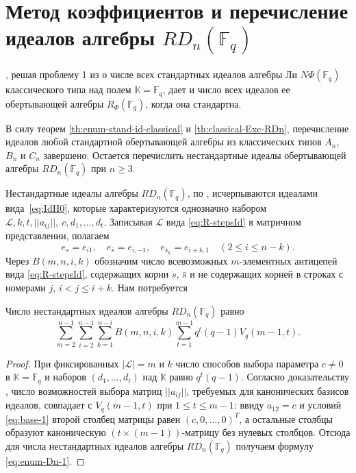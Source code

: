 \documentclass[a4paper,14pt,oneside,openany]{memoir}
\begin{document}
\section{Метод коэффициентов и перечисление идеалов алгебры \texorpdfstring{$RD_n(\mathbb{F}_q)$}{RDₙ(F₍q₎)}}\label{sec:egorychev-RDn}
%
, решая проблему 1 из \cite{sigsam2001}
о числе всех стандартных идеалов алгебры Ли $N\Phi(\mathbb{F}_q)$ классического
типа над полем $\mathbb{K}=\mathbb{F}_q$, дает и число всех идеалов ее обертывающей алгебры
$R_{\Phi}(\mathbb{F}_q)$, когда она стандартна.

В силу теорем \ref{th:enum-stand-id-classical} и \ref{th:classical-Exc-RDn},
перечисление идеалов любой стандартной обертывающей алгебры из
 классических типов $A_n$, $B_n$ и $C_n$ завершено.
Остается перечислить нестандартные идеалы обертывающей алгебры
$RD_n(\mathbb{F}_q)$ при $n\geq3$.

\medskip

Нестандартные идеалы алгебры $RD_n(\mathbb{F}_q)$, по ,
исчерпываются идеалами вида~\eqref{eq:IdH0}, которые характеризуются однозначно
набором $\mathcal{L}, k, t, ||a_{ij}||,\ c, d_1, \dots, d_t$. Записывая
$\mathcal{L}$ вида \eqref{eq:R-stepsId} в матричном представлении, полагаем
\[
    e_{s}=e_{i1},\quad e_{\bar{s}}=e_{i,-1},\quad e_{s_k}=e_{i+k,1}\quad (2\leq i\leq n-k).
\]
Через $B(m,n,i,k)$ обозначим число всевозможных $m$-элементных антицепей вида
\eqref{eq:R-stepsId}, содержащих корни $s$, $\bar{s}$ и не содержащих корней в
строках с номерами $j$, $i < j \leq i+k$. Нам потребуется

\begin{lemma}\label{l:rdn}
    Число нестандартных идеалов алгебры $RD_n(\mathbb{F}_q)$ равно
    \begin{equation}\label{eq:enum-Dn-1}
        \sum_{m=2}^{n-1} \sum_{i=2}^{n-1} \sum_{k=1}^{n-i}
        B(m,n,i,k)\sum_{t=1}^{m-1}q^t(q-1)V_q(m-1,t).
    \end{equation}
\end{lemma}

\begin{proof}
    При фиксированных $|\mathcal{L}|= m$ и $k$ число способов выбора параметра
    $c\neq 0$ в $\mathbb{K}=\mathbb{F}_q$ и наборов $(d_1, \dots , d_t)$ над
    $\mathbb{K}$ равно $q^t(q-1)$. Согласно доказательству ,
    число возможностей выбора матриц $||a_{ij}||$, требуемых для канонических
    базисов идеалов, совпадает с $V_q(m-1,t)$ при $1 \leq t \leq m-1$: ввиду
    $a_{12}=c$ и условий \eqref{eq:base-1} второй столбец матрицы равен
    $(c,0,\dots,0)^T$, а остальные столбцы образуют каноническую
    $(t\times(m-1))$-матрицу без нулевых столбцов. Отсюда для числа нестандартных
    идеалов алгебры $RD_n(\mathbb{F}_q)$ получаем формулу \eqref{eq:enum-Dn-1}.
\end{proof}
\end{document}
